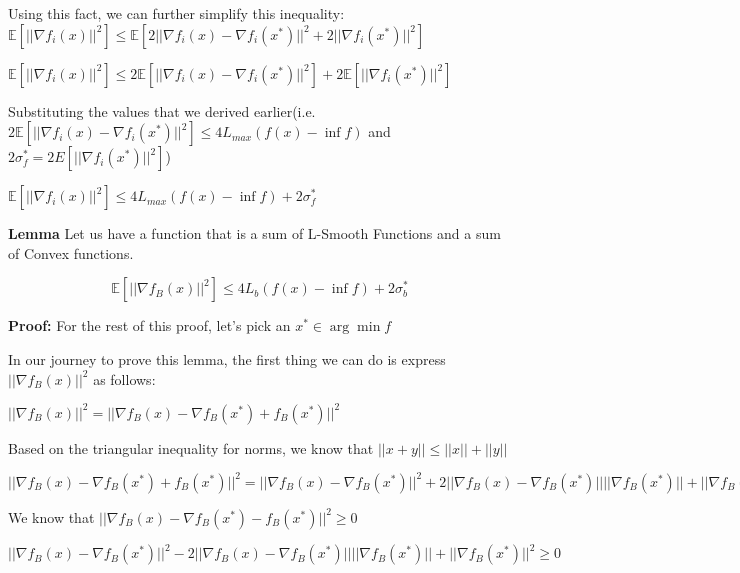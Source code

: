 Using this fact, we can further simplify this inequality: \noindent $\mathbb{E}[||\nabla f_i(x)||^2] \leq \mathbb{E} [2||\nabla f_i(x) - \nabla f_i(x^*)||^2 + 2||\nabla f_i(x^*)||^2]$ \newline 

\noindent $\mathbb{E}[||\nabla f_i(x)||^2] \leq 2\mathbb{E} [||\nabla f_i(x) - \nabla f_i(x^*)||^2] + 2 \mathbb{E}  [||\nabla f_i(x^*)||^2]$ \newline 

Substituting the values that we derived earlier(i.e. $2\mathbb{E}[||\nabla f_i(x) - \nabla f_i(x^*)||^2] \leq 4L_{max} (f(x) - \inf f)$ and $2 \sigma_f^* = 2 E[||\nabla f_i(x^*)||^2]$) \newline 

\noindent $\mathbb{E}[||\nabla f_i(x)||^2] \leq 4L_{max} (f(x) - \inf f) + 2 \sigma_f^*$

\noindent \textbf{Lemma} Let us have a function that is a sum of L-Smooth Functions and a sum of Convex functions. 

\begin{equation}
    \mathbb{E}[||\nabla f_B(x)||^2] \leq 4 L_b (f(x) - \inf f) + 2\sigma_b^*
\end{equation}

\noindent \textbf{Proof:} \newline 
For the rest of this proof, let's pick an $x^* \in \arg \min f$

In our journey to prove this lemma, the first thing we can do is express $||\nabla f_B(x)||^2$ as follows: \newline 

$||\nabla f_B(x)||^2 = ||\nabla f_B(x) - \nabla f_B(x^*) + f_B(x^*)||^2$ \newline 

Based on the triangular inequality for norms, we know that $||x + y|| \leq ||x|| + ||y||$ \newline 

$||\nabla f_B(x) - \nabla f_B(x^*) + f_B(x^*)||^2 = ||\nabla f_B(x) - \nabla f_B(x^*)||^2 + 2 ||\nabla f_B(x) - \nabla f_B(x^*)|| ||\nabla f_B(x^*)|| + ||\nabla f_B(x^*)||^2$ \newline 

We know that $||\nabla f_B(x) - \nabla f_B(x^*) - f_B(x^*)||^2 \geq 0$ \newline 

$||\nabla f_B(x) - \nabla f_B(x^*)||^2 - 2 ||\nabla f_B(x) - \nabla f_B(x^*)|| ||\nabla f_B(x^*)|| + ||\nabla f_B(x^*)||^2 \geq 0$ \newline 

